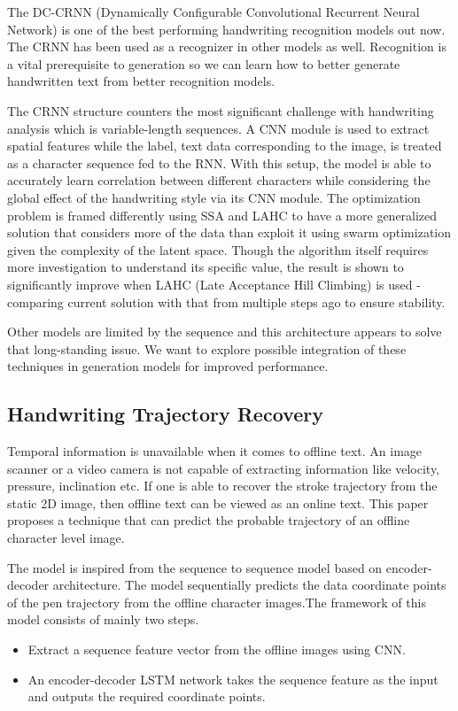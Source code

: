 \documentclass[10pt,twocolumn,letterpaper]{article}
\begin{document}
The DC-CRNN (Dynamically Configurable Convolutional Recurrent Neural Network) \cite{crnn} is one of the best performing handwriting recognition models out now. The CRNN has been used as a recognizer in other models as well. Recognition is a vital prerequisite to generation so we can learn how to better generate handwritten text from better recognition models.

The CRNN structure counters the most significant challenge with handwriting analysis which is variable-length sequences. A CNN module is used to extract spatial features while the label, text data corresponding to the image, is treated as a character sequence fed to the RNN. With this setup, the model is able to accurately learn correlation between different characters while considering the global effect of the handwriting style via its CNN module. The optimization problem is framed differently using SSA and LAHC to have a more generalized solution that considers more of the data than exploit it using swarm optimization given the complexity of the latent space. Though the algorithm itself requires more investigation to understand its specific value, the result is shown to significantly improve when LAHC (Late Acceptance Hill Climbing) is used - comparing current solution with that from multiple steps ago to ensure stability.

Other models are limited by the sequence and this architecture appears to solve that long-standing issue. We want to explore possible integration of these techniques in generation models for improved performance.

\subsection{Handwriting Trajectory Recovery\cite{image2stroke-1Char}}
\label{subsec: img2stroke}
Temporal information is unavailable when it comes to offline text. An image scanner or a video camera is not capable of extracting information like velocity, pressure, inclination etc. If one is able to recover the stroke trajectory from the static 2D image, then offline text can be viewed as an online text. This paper \cite{image2stroke-1Char} proposes a technique that can predict the probable trajectory of an offline character level image.

The model is inspired from the sequence to sequence model based on encoder-decoder architecture. The model sequentially predicts the data coordinate points of the pen trajectory from the offline character images.The framework of this model consists of mainly two steps.
\begin{itemize}
    \item Extract a sequence feature vector from the offline images using CNN.
    \item  An encoder-decoder LSTM network takes the sequence feature as the input and outputs the required coordinate points.
\end{itemize}
\end{document}
